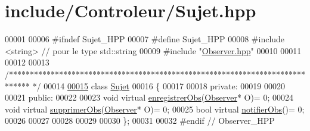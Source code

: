\hypertarget{_sujet_8hpp_source}{\section{include/\-Controleur/\-Sujet.hpp}
}

\begin{DoxyCode}
00001 
00006 \textcolor{preprocessor}{#ifndef Sujet\_HPP}
00007 \textcolor{preprocessor}{}\textcolor{preprocessor}{#define Sujet\_HPP}
00008 \textcolor{preprocessor}{}\textcolor{preprocessor}{#include <string>} \textcolor{comment}{// pour le type std::string}
00009 \textcolor{preprocessor}{#include "\hyperlink{_observer_8hpp}{Observer.hpp}"} 
00010 
00011 
00012 
00013 \textcolor{comment}{/*****************************************************************************
      */}
00014 
\hypertarget{_sujet_8hpp_source_l00015}{}\hyperlink{class_sujet}{00015} \textcolor{keyword}{class }\hyperlink{class_sujet}{Sujet}
00016 \{
00017 
00018     \textcolor{keyword}{private}:
00019         
00020     
00021     \textcolor{keyword}{public}:
00022         
00023         \textcolor{keywordtype}{void} \textcolor{keyword}{virtual} \hyperlink{class_sujet_aacd8c7455737c41df8fc5ebbea865745}{enregistrerObs}(\hyperlink{class_observer}{Observer}* O)= 0;
00024         \textcolor{keywordtype}{void} \textcolor{keyword}{virtual} \hyperlink{class_sujet_a6d121bdc49579675064cfd038b751922}{supprimerObs}(\hyperlink{class_observer}{Observer}* O)= 0;
00025         \textcolor{keywordtype}{bool} \textcolor{keyword}{virtual} \hyperlink{class_sujet_a210b37440cb4dbb5eff2770a44c14b0d}{notifierObs}()= 0;
00026         
00027         
00028         
00029         
00030 \};
00031 
00032 \textcolor{preprocessor}{#endif // Observer\_HPP      }
\end{DoxyCode}
